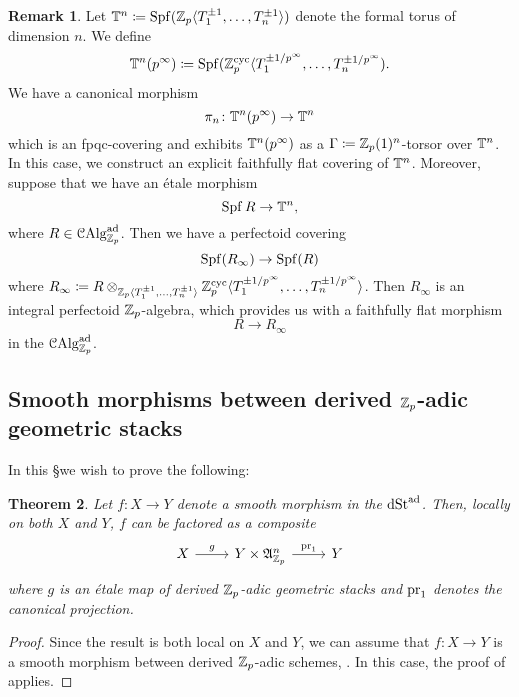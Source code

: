 \documentclass[10pt,a4paper]{amsart}
\numberwithin{equation}{subsection}
\newtheorem{theorem}{Theorem}[subsection]
\theoremstyle{definition}
\newtheorem{remark}[theorem]{Remark}
\begin{document}
\begin{remark}
    Let $\mathbb T^n \coloneqq \operatorname{Spf} (\mathbb Z_p \langle T_1^{\pm 1}, \dots , T_n^{\pm 1} \rangle)$ denote the formal torus of dimension $n$. We define
        \[
                \mathbb T^n(p^\infty) \coloneqq \operatorname{Spf} ( \mathbb Z_p^{\mathrm{cyc}} \langle T_1^{\pm 1/p^\infty}, \dots, T_n^{\pm 1/p^\infty})  .
        \]
    We have a canonical morphism
        \[
            \pi_n \colon \mathbb T^n(p^\infty) \to \mathbb T^n  
        \]
    which is an fpqc-covering and exhibits $\mathbb T^n(p^\infty)$ as a $\Gamma \coloneqq \mathbb Z_p(1)^n$-torsor over $\mathbb T^n$. 
    In this case, we construct an explicit faithfully flat covering of $\mathbb T^n$. Moreover, suppose that we have an \'etale morphism 
        \[
                \operatorname{Spf} R \to \mathbb T^n,
        \]
    where $ R \in \mathcal C \mathrm{Alg}^{\mathrm{ad}}_{\mathbb Z_p}$. Then we have a perfectoid covering
        \[
                \operatorname{Spf} (R_\infty) \to \operatorname{Spf}(R)  
        \]
    where $R_\infty \coloneqq R \otimes_{\mathbb Z_p \langle T_1^{\pm 1}, \dots , T_n^{\pm 1} \rangle} \mathbb Z_p^{\mathrm{cyc}} \langle T_1^{\pm 1/p^\infty}, \dots, T_n^{\pm 1/p^\infty} \rangle$.
    Then $R_\infty$ is an integral perfectoid $\mathbb Z_p$-algebra, which provides us with a faithfully flat morphism
        \[
                R \to R_\infty    
        \] 
    in the \infcat $\mathcal C \mathrm{Alg}^{\mathrm{ad}}_{\mathbb Z_p}$. 
\end{remark}

\subsection{Smooth morphisms between derived $\mathbb Z_p$-adic geometric stacks}

In this \S we wish to prove the following:

\begin{theorem}
    Let $f \colon X \to Y$ denote a smooth morphism in the \infcat $\mathrm{dSt}^{\mathrm{ad}}$. Then, locally on both $X$ and $Y$, $f$ can be factored as a composite
        \[
        \begin{tikzcd}
                X \ar{r}{g} & Y \times \fA^n_{\bZp} \ar{r}{\mathrm{pr}_1} & Y
        \end{tikzcd}
        \]
    where $g$ is an \'etale map of derived $\mathbb Z_p$-adic geometric stacks and $\mathrm{pr}_1$ denotes the canonical projection.
\end{theorem}

\begin{proof}
    Since the result is both local on $X$ and $Y$, we can assume that $f \colon X \to Y$ is a smooth morphism between derived $\mathbb Z_p$-adic schemes, . In this case, the proof of \cite[Proposition 5.50]{porta2017representability} applies. 
\end{proof}
\end{document}
